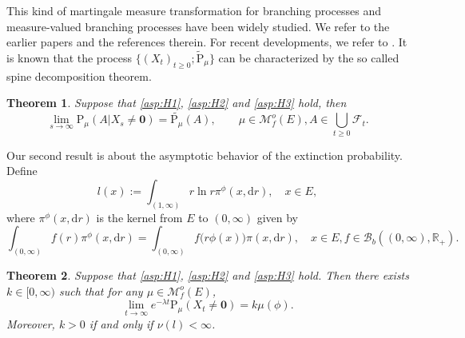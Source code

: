 \documentclass[12pt,a4paper]{amsart}
\numberwithin{equation}{section}
\theoremstyle{plain}
\newtheorem{thm}{Theorem}[section]
\theoremstyle{definition}
\theoremstyle{remark}
\begin{document}
	This kind of martingale measure transformation for branching processes and measure-valued branching processes have been widely studied.
	We refer to the earlier papers \cite{EnglanderKyprianou2004Local,Evans1993Two,RoellyRouault1989Processus,Penisson2010Conditional} and the references therein.
	For recent developments, we refer to \cite{ChampagnatRoelly2008Limit,RenSongSun2020Spine,RenSongZhang2018Williams}.
	It is known that the process $\{(X_t)_{t\geq 0}; \widetilde{\mathrm P}_{\mu}\}$ can be characterized by the so called spine decomposition theorem.
	\begin{thm} \label{thm:Q}
	Suppose that \eqref{asp:H1}, \eqref{asp:H2} and \eqref{asp:H3} hold, then
\[
	\lim_{s \rightarrow \infty} \mathrm P_\mu(A |X_s\neq \mathbf 0)=
	\widetilde{\mathrm P_\mu}(A),
	\qquad \mu \in \mathcal M_f^o(E), A\in \bigcup_{t\geq 0}\mathscr F_t.
\]
\end{thm}

	Our second result is about the asymptotic behavior of the extinction probability.
	Define
\begin{equation}
	l(x)
	:= \int_{(1,\infty)} r\ln r\pi^\phi(x, {\mathrm d}r),\quad x \in E,
\end{equation}
	where $\pi^\phi(x, \mathrm dr)$ is the kernel from $E$ to $(0,\infty)$ given by
\begin{equation}
	\int_{(0,\infty)} f(r)\pi^\phi(x,{\mathrm d}r)
	=\int_{(0,\infty)} f\big(r\phi(x)\big)\pi(x, {\mathrm d}r),
	\quad x\in E, f\in\mathcal B_b((0,\infty),\mathbb R_+).
\end{equation}

\begin{thm} \label{thm:E}
	Suppose that \eqref{asp:H1}, \eqref{asp:H2} and \eqref{asp:H3} hold.	
	Then there exists $k\in [0,\infty)$ such that for any $\mu \in \mathcal M_f^o(E)$,
\begin{equation}
	\lim_{t\rightarrow\infty} e^{-\lambda t}\mathrm P_\mu(X_t \neq \mathbf 0)
	=k\mu(\phi).
\end{equation}
	Moreover, $k>0$ if and only if $\nu(l)<\infty$.
\end{thm}
\end{document}
